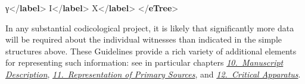 \begin{shaded}
\hspace*{1em}\mbox{}\newline 
{}\mbox{}\newline 
{}\mbox{}\newline 
\hspace*{1em}γ{</\textbf{label}>}\mbox{}\newline 
\hspace*{1em}\mbox{}\newline 
\hspace*{1em}\hspace*{1em}I{</\textbf{label}>}\mbox{}\newline 
\hspace*{1em}\mbox{}\newline 
\hspace*{1em}\mbox{}\newline 
\hspace*{1em}\hspace*{1em}X{</\textbf{label}>}\mbox{}\newline 
\hspace*{1em}\mbox{}\newline 
{}\mbox{}\newline 
{</\textbf{eTree}>}\end{shaded}\egroup\par \par
In any substantial codicological project, it is likely that significantly more data will be required about the individual witnesses than indicated in the simple structures above. These Guidelines provide a rich variety of additional elements for representing such information: see in particular chapters \textit{\hyperref[MS]{10.\ Manuscript Description}}, \textit{\hyperref[PH]{11.\ Representation of Primary Sources}}, and \textit{\hyperref[TC]{12.\ Critical Apparatus}}.
